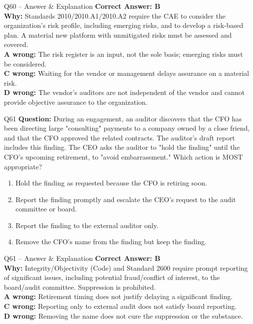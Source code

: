 \documentclass[aspectratio=169,10pt]{beamer}
\begin{document}
	\begin{frame}[t]{Q60 -- Answer \& Explanation}
		\small
		\textbf{Correct Answer: B} \\[4pt]
		\textbf{Why:} Standards 2010/2010.A1/2010.A2 require the CAE to consider the organization's risk profile, including emerging risks, and to develop a risk-based plan. A material new platform with unmitigated risks must be assessed and covered. \\[4pt]
		\textbf{A wrong:} The risk register is an input, not the sole basis; emerging risks must be considered. \\[2pt]
		\textbf{C wrong:} Waiting for the vendor or management delays assurance on a material risk. \\[2pt]
		\textbf{D wrong:} The vendor's auditors are not independent of the vendor and cannot provide objective assurance to the organization.
	\end{frame}
	
	\begin{frame}[t]{Q61}
		\small
		\textbf{Question:} During an engagement, an auditor discovers that the CFO has been directing large "consulting" payments to a company owned by a close friend, and that the CFO approved the related contracts. The auditor's draft report includes this finding. The CEO asks the auditor to "hold the finding" until the CFO's upcoming retirement, to "avoid embarrassment." Which action is MOST appropriate?
		\begin{enumerate}[label=\Alph*.,itemsep=1pt,topsep=2pt]
			\item Hold the finding as requested because the CFO is retiring soon.
			\item Report the finding promptly and escalate the CEO's request to the audit committee or board.
			\item Report the finding to the external auditor only.
			\item Remove the CFO's name from the finding but keep the finding.
		\end{enumerate}
	\end{frame}
	
	\begin{frame}[t]{Q61 -- Answer \& Explanation}
		\small
		\textbf{Correct Answer: B} \\[4pt]
		\textbf{Why:} Integrity/Objectivity (Code) and Standard 2600 require prompt reporting of significant issues, including potential fraud/conflict of interest, to the board/audit committee. Suppression is prohibited. \\[4pt]
		\textbf{A wrong:} Retirement timing does not justify delaying a significant finding. \\[2pt]
		\textbf{C wrong:} Reporting only to external audit does not satisfy board reporting. \\[2pt]
		\textbf{D wrong:} Removing the name does not cure the suppression or the substance.
	\end{frame}
	
\end{document}
